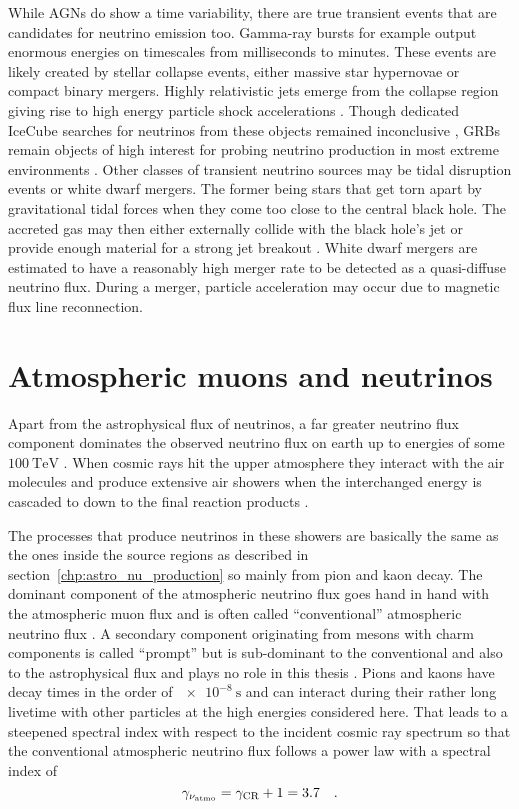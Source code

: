 While AGNs do show a time variability, there are true transient events that are candidates for neutrino emission too.
Gamma-ray bursts for example output enormous energies on timescales from milliseconds to minutes.
These events are likely created by stellar collapse events, either massive star hypernovae or compact binary mergers.
Highly relativistic jets emerge from the collapse region giving rise to high energy particle shock accelerations .
Though dedicated IceCube searches for neutrinos from these objects remained inconclusive , GRBs remain objects of high interest for probing neutrino production in most extreme environments .
Other classes of transient neutrino sources may be tidal disruption events or white dwarf mergers.
The former being stars that get torn apart by gravitational tidal forces when they come too close to the central black hole.
The accreted gas may then either externally collide with the black hole's jet or provide enough material for a strong jet breakout .
White dwarf mergers are estimated to have a reasonably high merger rate to be detected as a quasi-diffuse neutrino flux.
During a merger, particle acceleration may occur due to magnetic flux line reconnection.


\section{Atmospheric muons and neutrinos}
Apart from the astrophysical flux of neutrinos, a far greater neutrino flux component dominates the observed neutrino flux on earth up to energies of some $\SI{100}{\TeV}$ .
When cosmic rays hit the upper atmosphere they interact with the air molecules and produce extensive air showers when the interchanged energy is cascaded to down to the final reaction products .

The processes that produce neutrinos in these showers are basically the same as the ones inside the source regions as described in section~\ref{chp:astro_nu_production} so mainly from pion and kaon decay.
The dominant component of the atmospheric neutrino flux goes hand in hand with the atmospheric muon flux and is often called \enquote{conventional} atmospheric neutrino flux .
A secondary component originating from mesons with charm components is called \enquote{prompt} but is sub-dominant to the conventional and also to the astrophysical flux and plays no role in this thesis .
Pions and kaons have decay times in the order of $\SI{e-8}{\s}$ and can interact during their rather long livetime with other particles at the high energies considered here.
That leads to a steepened spectral index with respect to the incident cosmic ray spectrum so that the conventional atmospheric neutrino flux follows a power law with a spectral index of 
\begin{equation}
  \gamma_{\nu_\text{atmo}} = \gamma_\text{CR} + 1 = 3.7
  \quad\text{.}
\end{equation}